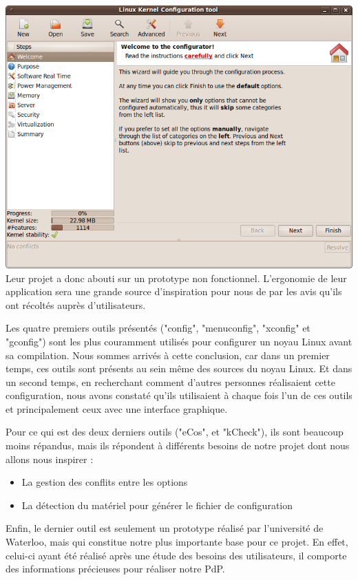 \documentclass[16pts]{report}
\begin{document}
\includegraphics[scale=0.6]{illustrations/lkc_config.png} \\

Leur projet a donc abouti sur un prototype non fonctionnel.  L’ergonomie de
leur application sera une grande source d’inspiration pour nous de par les avis
qu’ils ont récoltés auprès d’utilisateurs.

Les quatre premiers outils présentés ("config", "menuconfig", "xconfig" et
"gconfig") sont les plus couramment utilisés pour configurer un noyau Linux
avant sa compilation. Nous sommes arrivés à cette conclusion, car dans un
premier temps, ces outils sont présents au sein même des sources du noyau
Linux.  Et dans un second temps, en recherchant comment d'autres personnes
réalisaient cette configuration, nous avons constaté qu'ils utilisaient à
chaque fois l'un de ces outils et principalement ceux avec une interface
graphique.

Pour ce qui est des deux derniers outils ("eCos", et "kCheck"), ils sont
beaucoup moins répandus, mais ils répondent à différents besoins de notre projet
dont nous allons nous inspirer :
\begin{itemize}
    \item La gestion des conflits entre les options
    \item La détection du matériel pour générer le fichier de configuration
\end{itemize}

Enfin, le dernier outil est seulement un prototype réalisé par l'université de
Waterloo, mais qui constitue notre plus importante base pour ce projet. En
effet, celui-ci ayant été réalisé après une étude des besoins des utilisateurs,
il comporte des informations précieuses pour réaliser notre PdP.
\end{document}
